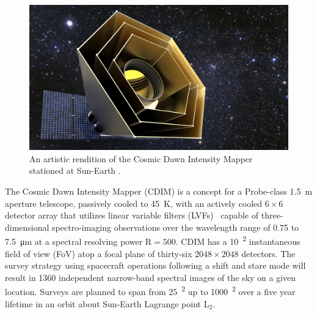 \documentclass{ws-jai}
\begin{document}

\begin{figure}[!hb]
  \centering
  \includegraphics[width=.7\linewidth]{figs/cdim_cover-render.jpg}
  \caption{An artistic rendition of the Cosmic Dawn Intensity Mapper stationed at Sun-Earth \Ltwo.}
\label{fig:cover}
\end{figure}

The Cosmic Dawn Intensity Mapper (CDIM) is a concept for a Probe-class \SI{1.5}{\meter} aperture telescope, passively cooled to \SI{45}{\kelvin}, with an actively cooled $6\times6$ detector array that utilizes linear variable filters (LVFs)~\cite{cooray2016cdim2page} capable of three-dimensional spectro-imaging observations over the wavelength range of 0.75 to \SI{7.5}{\micro\meter} at a spectral resolving power R$=500$.
CDIM has a \SI{10}{\deg\squared} instantaneous field of view (FoV) atop a focal plane of thirty-six $2048\times2048$ detectors.
The survey strategy using spacecraft operations following a shift and stare mode will result in 1360 independent narrow-band spectral images of the sky on a given location.
Surveys are planned to span from \SI{25}{\deg\squared} up to \SI{1000}{\deg\squared} over a five year lifetime in an orbit about Sun-Earth Lagrange point L$_{2}$\@.
\end{document}
